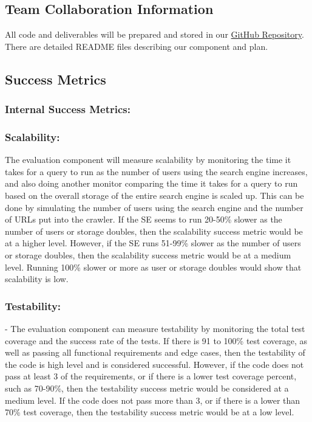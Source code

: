 \subsection*{Team Collaboration Information}
All code and deliverables will be prepared and stored in our \href{https://github.com/justinottesen/LSPT-Evaluation}{GitHub Repository}. There are detailed README files describing our component and plan.

\subsection*{Success Metrics}
\subsubsection*{Internal Success Metrics:}
\medskip
\subsubsection*{Scalability:}
The evaluation component will measure scalability by monitoring the time it takes
for a query to run as the number of users using the search engine increases, and 
also doing another monitor comparing the time it takes for a query to run based on 
the overall storage of the entire search engine is scaled up. This can be done by 
simulating the number of users using the search engine and the number of URLs put 
into the crawler. If the SE seems to run 20-50\% slower as the number of users or 
storage doubles, then the scalability success metric would be at a higher level. 
However, if the SE runs 51-99\% slower as the number of users or storage doubles, 
then the scalability success metric would be at a medium level. Running 100\% 
slower or more as user or storage doubles would show that scalability is low. 

\smallskip

\subsubsection*{Testability:}
- The evaluation component can measure testability by monitoring the total test 
coverage and the success rate of the tests. If there is 91 to 100\% test coverage, 
as well as passing all functional requirements and edge cases, then the 
testability of the code is high level and is considered successful. However, if 
the code does not pass at least 3 of the requirements, or if there is a lower test 
coverage percent, such as 70-90\%, then the testability success metric would be 
considered at a medium level. If the code does not pass more than 3, or if there 
is a lower than 70\% test coverage, then the testability success metric would be 
at a low level.

